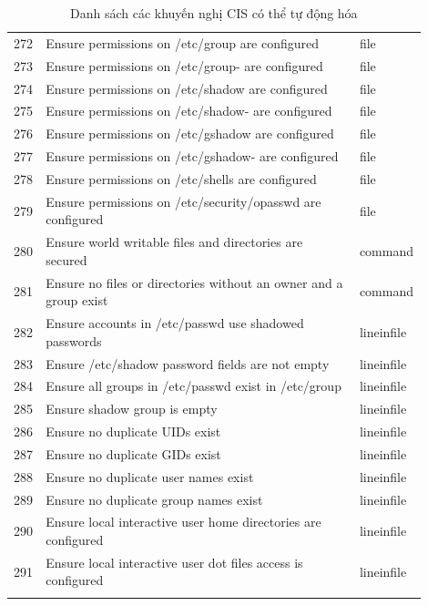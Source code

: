 \begin{longtable}{|p{0.05\linewidth}|p{0.75\linewidth}|p{0.1\linewidth}|}
272 & Ensure permissions on /etc/group are configured & file \\
273 & Ensure permissions on /etc/group- are configured & file \\
274 & Ensure permissions on /etc/shadow are configured & file \\
275 & Ensure permissions on /etc/shadow- are configured & file \\
276 & Ensure permissions on /etc/gshadow are configured & file \\
277 & Ensure permissions on /etc/gshadow- are configured & file \\
278 & Ensure permissions on /etc/shells are configured & file \\
279 & Ensure permissions on /etc/security/opasswd are configured & file \\
280 & Ensure world writable files and directories are secured & command \\
281 & Ensure no files or directories without an owner and a group exist & command \\
282 & Ensure accounts in /etc/passwd use shadowed passwords & lineinfile \\
283 & Ensure /etc/shadow password fields are not empty & lineinfile \\
284 & Ensure all groups in /etc/passwd exist in /etc/group & lineinfile \\
285 & Ensure shadow group is empty & lineinfile \\
286 & Ensure no duplicate UIDs exist & lineinfile \\
287 & Ensure no duplicate GIDs exist & lineinfile \\
288 & Ensure no duplicate user names exist & lineinfile \\
289 & Ensure no duplicate group names exist & lineinfile \\
290 & Ensure local interactive user home directories are configured & lineinfile \\
291 & Ensure local interactive user dot files access is configured & lineinfile \\
\hline
\caption{Danh sách các khuyến nghị CIS có thể tự động hóa}
\label{tab:automated_recommendations}
\end{longtable}
